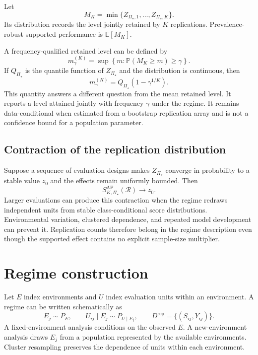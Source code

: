 \documentclass[11pt]{article}
\newcommand{\Regime}{\mathcal{R}}
\newcommand{\PSet}{\Pi_\star}
\newcommand{\E}{\mathbb{E}}
\newcommand{\Prb}{\mathbb{P}}
\theoremstyle{remark}
\begin{document}
Let
\[
M_K
=
\min\{Z_{\PSet,1},\ldots,Z_{\PSet,K}\}.
\]
Its distribution records the level jointly retained by $K$ replications. Prevalence-robust supported performance is $\E[M_K]$.

A frequency-qualified retained level can be defined by
\[
m_\gamma^{(K)}
=
\sup
\left\{
m:
\Prb(M_K\geq m)\geq\gamma
\right\}.
\]
If $Q_{\PSet}$ is the quantile function of $Z_{\PSet}$ and the distribution is continuous, then
\begin{equation}
m_\gamma^{(K)}
=
Q_{\PSet}\left(1-\gamma^{1/K}\right).
\label{eq:frequency-level}
\end{equation}
This quantity answers a different question from the mean retained level. It reports a level attained jointly with frequency $\gamma$ under the regime. It remains data-conditional when estimated from a bootstrap replication array and is not a confidence bound for a population parameter.

\subsection{Contraction of the replication distribution}

Suppose a sequence of evaluation designs makes $Z_{\PSet}$ converge in probability to a stable value $z_0$ and the effects remain uniformly bounded. Then
\[
S_{K,\PSet}^{\mathrm{AP}}(\Regime)
\longrightarrow
z_0.
\]
Larger evaluations can produce this contraction when the regime redraws independent units from stable class-conditional score distributions. Environmental variation, clustered dependence, and repeated model development can prevent it. Replication counts therefore belong in the regime description even though the supported effect contains no explicit sample-size multiplier.

\section{Regime construction}
\label{app:regime}

Let $E$ index environments and $U$ index evaluation units within an environment. A regime can be written schematically as
\[
E_j\sim P_E,
\qquad
U_{ij}\mid E_j\sim P_{U\mid E_j},
\qquad
D^{\mathrm{rep}}=\{(S_{ij},Y_{ij})\}.
\]
A fixed-environment analysis conditions on the observed $E$. A new-environment analysis draws $E_j$ from a population represented by the available environments. Cluster resampling preserves the dependence of units within each environment.
\end{document}
